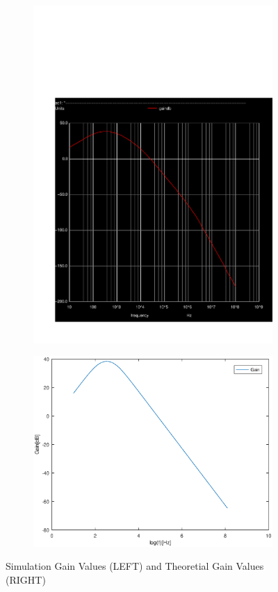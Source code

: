 \begin{figure}[ht]
\centering
\begin{subfigure}{.5\textwidth}
  \centering
  \includegraphics[width=0.9\linewidth]{../sim/gain.pdf}
\end{subfigure}%
\begin{subfigure}{.5\textwidth}
  \centering
  \vspace{3cm}
  \includegraphics[width=1\linewidth]{gainteo.eps}
\end{subfigure}
\caption{Simulation Gain Values (LEFT) and Theoretial Gain Values (RIGHT)}
\label{fig:sbs3}
\end{figure}

